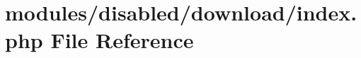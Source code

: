 \hypertarget{modules_2disabled_2download_2index_8php}{\section{modules/disabled/download/index.php File Reference}
\label{modules_2disabled_2download_2index_8php}
}
